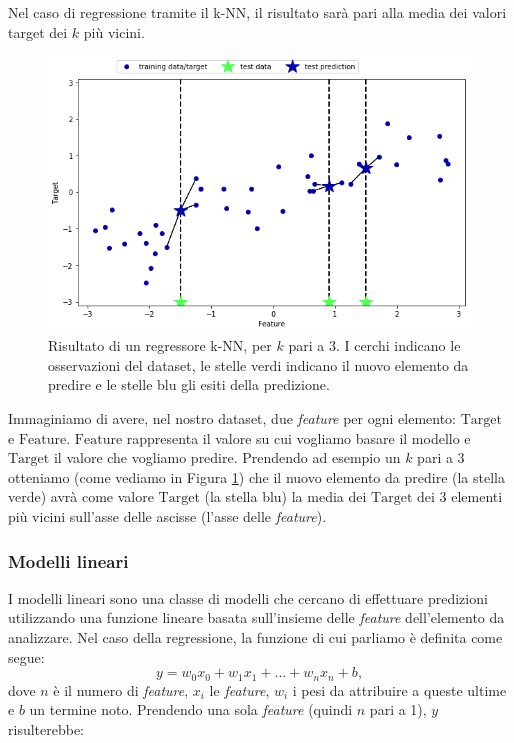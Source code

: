 \documentclass[12pt,italian]{report}
\begin{document}
Nel caso di regressione tramite il k-NN, il risultato sarà pari alla media dei valori target dei $ k $ più vicini.
\begin{figure}[h!]
	\center
	\includegraphics[scale=0.6]{../img/knn_regressor}
	\caption{Risultato di un regressore k-NN, per $k$ pari a 3. I cerchi indicano le osservazioni del dataset, le stelle verdi indicano il nuovo elemento da predire e le stelle blu gli esiti della predizione.}
	\label{fig:knn_regressor}
\end{figure}
Immaginiamo di avere, nel nostro dataset, due \emph{feature} per ogni elemento: $ \mathrm{Target} $ e $ \mathrm{Feature} $. $ \mathrm{Feature} $ rappresenta il valore su cui vogliamo basare il modello e $ \mathrm{Target} $ il valore che vogliamo predire. Prendendo ad esempio un $ k $ pari a 3 otteniamo (come vediamo in Figura \ref{fig:knn_regressor}) che il nuovo elemento da predire (la stella verde) avrà come valore $ \mathrm{Target} $ (la stella blu) la media dei $ \mathrm{Target} $ dei 3  elementi più vicini sull'asse delle ascisse (l'asse delle \emph{feature}).


\subsubsection{Modelli lineari}
I modelli lineari sono una classe di modelli che cercano di effettuare predizioni utilizzando una funzione lineare basata sull'insieme delle \emph{feature} dell'elemento da analizzare. 
Nel caso della regressione, la funzione di cui parliamo è definita come segue:
\[ y = w_{0}x_{0} + w_{1}x_{1} + ... + w_{n}x_{n} + b ,\]
dove $n$ è il numero di \emph{feature}, $x_{i}$ le \emph{feature}, $ w_{i} $ i pesi da attribuire a queste ultime e $ b $ un termine noto.
Prendendo una sola \emph{feature} (quindi $ n $ pari a 1), $ y $ risulterebbe:
\end{document}
